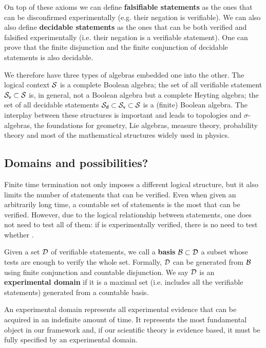 \documentclass[twocolumn]{article}
\begin{document}
On top of these axioms we can define \textbf{falsifiable statements} as the ones that can be disconfirmed experimentally (e.g. their negation is verifiable). We can also also define \textbf{decidable statements} as the ones that can be both verified and falsified experimentally (i.e. their negation is a verifiable statement). One can prove that the finite disjunction and the finite conjunction of decidable statements is also decidable.

We therefore have three types of algebras embedded one into the other. The logical context $\mathcal{S}$ is a complete Boolean algebra; the set of all verifiable statement $\mathcal{S}_\textsf{v} \subset \mathcal{S}$ is, in general, not a Boolean algebra but a complete Heyting algebra; the set of all decidable statements $\mathcal{S}_\textsf{d} \subset \mathcal{S}_\textsf{v} \subset \mathcal{S}$ is a (finite) Boolean algebra. The interplay between these structures is important and leads to topologies and $\sigma$-algebras, the foundations for geometry, Lie algebras, measure theory, probability theory and most of the mathematical structures widely used in physics.

\subsection{Domains and possibilities?}

Finite time termination not only imposes a different logical structure, but it also limits the number of statements that can be verified. Even when given an arbitrarily long time, a countable set of statements is the most that can be verified. However, due to the logical relationship between statements, one does not need to test all of them: if  is experimentally verified, there is no need to test whether .

Given a set $\mathcal{D}$ of verifiable statements, we call a \textbf{basis} $\mathcal{B} \subset \mathcal{D}$ a subset whose tests are enough to verify the whole set. Formally, $\mathcal{D}$ can be generated from $\mathcal{B}$ using finite conjunction and countable disjunction. We say $\mathcal{D}$ is an \textbf{experimental domain} if it is a maximal set (i.e. includes all the verifiable statements) generated from a countable basis.

An experimental domain represents all experimental evidence that can be acquired in an indefinite amount of time. It represents the most fundamental object in our framework and, if our scientific theory is evidence based, it must be fully specified by an experimental domain.
\end{document}
